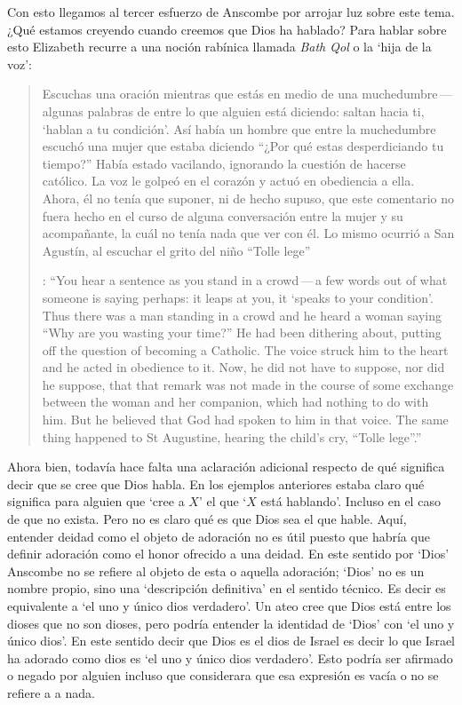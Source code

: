 Con esto llegamos al tercer esfuerzo de Anscombe por arrojar luz sobre este tema. ¿Qué estamos creyendo cuando creemos que Dios ha hablado? Para hablar sobre esto Elizabeth recurre a una noción rabínica llamada \emph{Bath Qol} o la `hija de la voz': \blockquote[{\cite[118--119]{anscombe1981erp:faith}}: \enquote{You hear a sentence as you stand in a crowd\,---\,a few words out of what someone is saying perhaps: it leaps at you, it `speaks to your condition'. Thus there was a man standing in a crowd and he heard a woman saying ``Why are you wasting your time?'' He had been dithering about, putting off the question of becoming a Catholic. The voice struck him to the heart and he acted in obedience to it. Now, he did not have to suppose, nor did he suppose, that that remark was not made in the course of some exchange between the woman and her companion, which had nothing to do with him. But he believed that God had spoken to him in that voice. The same thing happened to St Augustine, hearing the child's cry, ``Tolle lege''.}]{Escuchas una oración mientras que estás en medio de una muchedumbre\,---\,algunas palabras de entre lo que alguien está diciendo: saltan hacia ti, `hablan a tu condición'. Así había un hombre que entre la muchedumbre escuchó una mujer que estaba diciendo ``¿Por qué estas desperdiciando tu tiempo?'' Había estado vacilando, ignorando la cuestión de hacerse católico. La voz le golpeó en el corazón y actuó en obediencia a ella. Ahora, él no tenía que suponer, ni de hecho supuso, que este comentario no fuera hecho en el curso de alguna conversación entre la mujer y su acompañante, la cuál no tenía nada que ver con él. Lo mismo ocurrió a San Agustín, al escuchar el grito del niño ``Tolle lege''}.

Ahora bien, todavía hace falta una aclaración adicional respecto de qué significa decir que se cree que Dios habla. En los ejemplos anteriores estaba claro qué significa para alguien que \enquote*{cree a $X$} el que \enquote*{$X$ está hablando}. Incluso en el caso de que no exista. Pero no es claro qué es que Dios sea el que hable. Aquí, entender deidad como el objeto de adoración no es útil puesto que habría que definir adoración como el honor ofrecido a una deidad. En este sentido por `Dios' Anscombe no se refiere al objeto de esta o aquella adoración; `Dios' no es un nombre propio, sino una `descripción definitiva' en el sentido técnico. Es decir es equivalente a `el uno y único dios verdadero'. Un ateo cree que Dios está entre los dioses que no son dioses, pero podría entender la identidad de `Dios' con `el uno y único dios'. En este sentido decir que Dios es el dios de Israel es decir lo que Israel ha adorado como dios es `el uno y único dios verdadero'. Esto podría ser afirmado o negado por alguien incluso que considerara que esa expresión es vacía o no se refiere a a nada.

